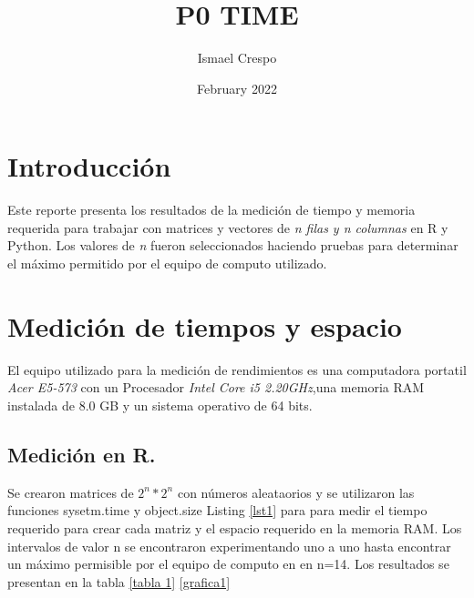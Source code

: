 \documentclass{article}
\title{P0 TIME}
\author{Ismael Crespo}
\date{February 2022}
\begin{document}
\maketitle

\section{Introducción}
Este reporte presenta los resultados de la medición de tiempo y memoria requerida para trabajar con matrices y vectores de \emph{n filas y n columnas} en R y Python. Los valores de \emph{n} fueron seleccionados haciendo pruebas para determinar el máximo permitido por el equipo de computo utilizado. 

\section{Medición de tiempos y espacio }
El equipo utilizado para la medición de rendimientos es una computadora portatil \emph{Acer E5-573 } con un Procesador \emph{Intel Core i5 2.20GHz},una memoria RAM instalada de 8.0 GB y un sistema operativo de 64 bits.
\subsection{Medición en R.} 
Se crearon matrices de $2^n * 2^n$ con números aleataorios y se utilizaron las funciones sysetm.time y object.size Listing \ref{lst1} para para medir el tiempo requerido para crear cada matriz y el espacio requerido en la memoria RAM. Los intervalos de valor n se encontraron experimentando uno a uno hasta encontrar un máximo permisible por el equipo de computo en en n=14. Los resultados se presentan en la tabla \ref{tabla 1} \ref{grafica1}
\end{document}
